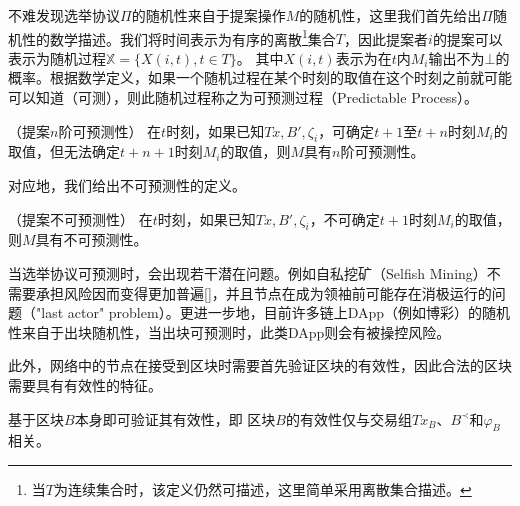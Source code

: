 不难发现选举协议$\Pi$的随机性来自于提案操作$M$的随机性，这里我们首先给出$\Pi$随机性的数学描述。我们将时间表示为有序的离散\footnote{当$T$为连续集合时，该定义仍然可描述，这里简单采用离散集合描述。}集合$T$，因此提案者$i$的提案可以表示为随机过程$\mathbb{X}=\{X(i,t),t\in T\}$。%
其中$X(i,t)$表示为在$t$内$M_i$输出不为$\bot$的概率。根据数学定义\cite{van2013introduction}，如果一个随机过程在某个时刻的取值在这个时刻之前就可能可以知道（可测），则此随机过程称之为可预测过程（Predictable Process）。

\begin{definition}
（提案$n$阶可预测性） 在$t$时刻，如果已知$Tx,B',\zeta_i$，可确定$t+1$至$t+n$时刻$M_i$的取值，但无法确定$t+n+1$时刻$M_i$的取值，则$M$具有$n$阶可预测性。
\end{definition}

对应地，我们给出不可预测性的定义。

\begin{definition}
（提案不可预测性） 在$t$时刻，如果已知$Tx,B',\zeta_i$，不可确定$t+1$时刻$M_i$的取值，则$M$具有不可预测性。
\end{definition}



当选举协议可预测时，会出现若干潜在问题。例如自私挖矿（Selfish Mining）不需要承担风险因而变得更加普遍[]，并且节点在成为领袖前可能存在消极运行的问题（"last actor" problem）\cite{hanke2018difinity}。更进一步地，目前许多链上DApp（例如博彩）的随机性来自于出块随机性，当出块可预测时，此类DApp则会有被操控风险。


此外，网络中的节点在接受到区块时需要首先验证区块的有效性，因此合法的区块需要具有有效性的特征。

\begin{property}
基于区块$B$本身即可验证其有效性，即                                                                                                                                                                                                                                                                                                                                                                                                                                                                                                                                                                                                                                                                                                                                                                   区块$B$的有效性仅与交易组$Tx_B$、$B^{\prec}$和$\varphi_B$相关。	
\end{property}

